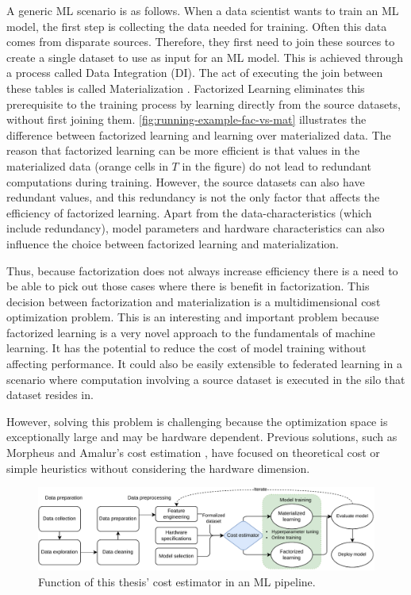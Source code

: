 A generic ML scenario is as follows. When a data scientist wants to train an ML model, the first step is collecting the data needed for training. Often this data comes from disparate sources. Therefore, they first need to join these sources to create a single dataset to use as input for an ML model. This is achieved through a process called Data Integration (DI). The act of executing the join between these tables is called Materialization \cite{rel_db_glossary}. Factorized Learning eliminates this prerequisite to the  training process by learning directly from the source datasets, without first joining them. \autoref{fig:running-example-fac-vs-mat} illustrates the difference between factorized learning and learning over materialized data. The reason that factorized learning can be more efficient is that values in the materialized data (orange cells in $T$ in the figure) do not lead to redundant computations during training. However, the source datasets can also have redundant values, and this redundancy is not the only factor that affects the efficiency of factorized learning. Apart from the data-characteristics (which include redundancy), model parameters and hardware characteristics can also influence the choice between factorized learning and materialization.

Thus, because factorization does not always increase efficiency there is a need to be able to pick out those cases where there is benefit in factorization. This decision between factorization and materialization is a multidimensional cost optimization problem. This is an interesting and important problem because factorized learning is a very novel approach to the fundamentals of machine learning. It has the potential to reduce the cost of model training without affecting performance. It could also be easily extensible to federated learning in a scenario where computation involving a source dataset is executed in the silo that dataset resides in.

However, solving this problem is challenging because the optimization space is exceptionally large and may be hardware dependent. Previous solutions, such as Morpheus \cite{morpheus} and Amalur's cost estimation \cite{schijndel_cost_estimation}, have focused on theoretical cost or simple heuristics without considering the hardware dimension.

\begin{figure}[h]
    \centering
    \includegraphics[width=0.95\linewidth]{chapters/01_introduction/figures/ML-Pipeline.pdf}
    \caption{Function of this thesis' cost estimator in an ML pipeline.}
    \label{fig:ml-pipeline}
\end{figure}

